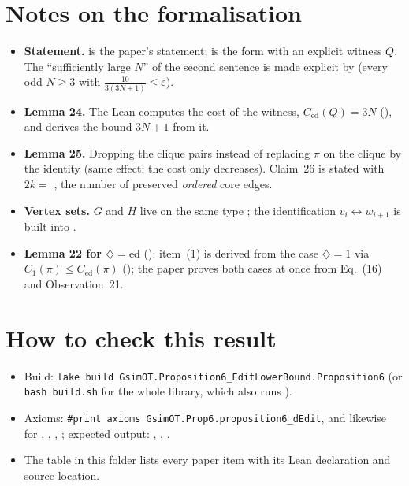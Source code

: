 \section{Notes on the formalisation}
\begin{itemize}
\item \textbf{Statement.}  is the paper's statement;  is
  the form with an explicit witness $Q$. The ``sufficiently large $N$'' of the second sentence is made explicit by
   (every odd $N\ge3$ with $\frac{10}{3(3N+1)}\le\varepsilon$).
\item \textbf{Lemma 24.} The Lean computes the cost of the witness, $C_{\mathrm{ed}}(Q)=3N$
  (), and  derives the bound $3N+1$ from it.
\item \textbf{Lemma 25.} Dropping the clique pairs instead of replacing $\pi$ on the clique by the identity
  (same effect: the cost only decreases). Claim~26 is stated with $2k=$ , the number of
  preserved \emph{ordered} core edges.
\item \textbf{Vertex sets.} $G$ and $H$ live on the same type ; the identification
  $v_i\leftrightarrow w_{i+1}$ is built into .
\item \textbf{Lemma 22 for $\diamondsuit=\mathrm{ed}$} (): item~(1)
  is derived from the case $\diamondsuit=1$ via $C_1(\pi)\le C_{\mathrm{ed}}(\pi)$
  (); the paper proves both cases at once from Eq.~(16) and Observation~21.
\end{itemize}

\section{How to check this result}
\begin{itemize}
\item Build: \texttt{lake build GsimOT.Proposition6\_EditLowerBound.Proposition6} (or \texttt{bash build.sh}
  for the whole library, which also runs ).
\item Axioms: \texttt{\#print axioms GsimOT.Prop6.proposition6\_dEdit}, and likewise for
  , , , ;
  expected output: , , .
\item The table  in this folder lists every paper item with its
  Lean declaration and source location.
\end{itemize}

